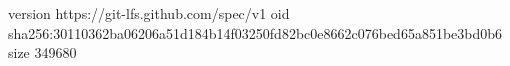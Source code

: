 version https://git-lfs.github.com/spec/v1
oid sha256:30110362ba06206a51d184b14f03250fd82bc0e8662c076bed65a851be3bd0b6
size 349680
